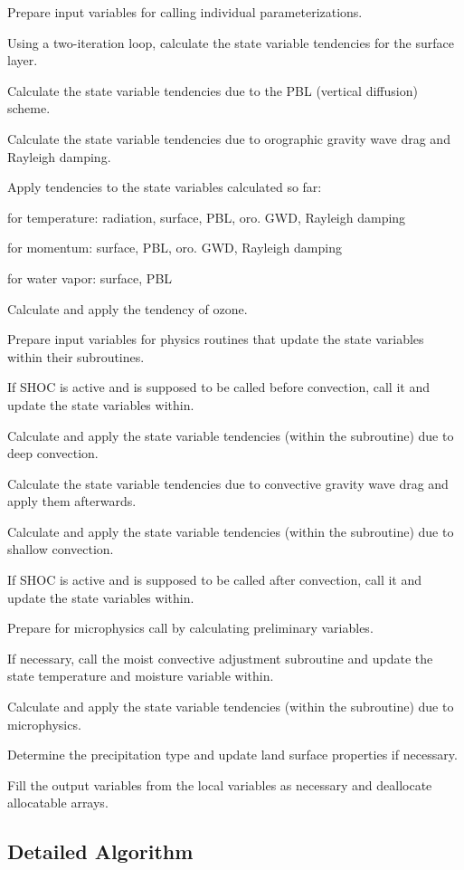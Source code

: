 \begin{DoxyEnumerate}
\item Prepare input variables for calling individual parameterizations.
\item Using a two-\/iteration loop, calculate the state variable tendencies for the surface layer.
\item Calculate the state variable tendencies due to the P\+BL (vertical diffusion) scheme.
\item Calculate the state variable tendencies due to orographic gravity wave drag and Rayleigh damping.
\item Apply tendencies to the state variables calculated so far\+:
\begin{DoxyItemize}
\item for temperature\+: radiation, surface, P\+BL, oro. G\+WD, Rayleigh damping
\item for momentum\+: surface, P\+BL, oro. G\+WD, Rayleigh damping
\item for water vapor\+: surface, P\+BL
\end{DoxyItemize}
\item Calculate and apply the tendency of ozone.
\item Prepare input variables for physics routines that update the state variables within their subroutines.
\item If S\+H\+OC is active and is supposed to be called before convection, call it and update the state variables within.
\item Calculate and apply the state variable tendencies (within the subroutine) due to deep convection.
\item Calculate the state variable tendencies due to convective gravity wave drag and apply them afterwards.
\item Calculate and apply the state variable tendencies (within the subroutine) due to shallow convection.
\item If S\+H\+OC is active and is supposed to be called after convection, call it and update the state variables within.
\item Prepare for microphysics call by calculating preliminary variables.
\item If necessary, call the moist convective adjustment subroutine and update the state temperature and moisture variable within.
\item Calculate and apply the state variable tendencies (within the subroutine) due to microphysics.
\item Determine the precipitation type and update land surface properties if necessary.
\item Fill the output variables from the local variables as necessary and deallocate allocatable arrays. 
\end{DoxyEnumerate}\subsection{Detailed Algorithm}\label{namespacemodule__physics__driver_detailed}
